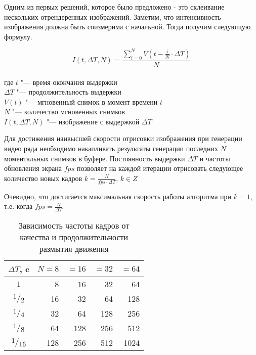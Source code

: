 Одним из первых решений, которое было предложено - это склеивание нескольких отрендеренных изображений. \cite{Haeberli90} Заметим, что интенсивность изображения должна быть соизмерима с начальной. Тогда получим следующую формулу.
\begin{eqndesc}
    \begin{equation}\label{F:F202}
        I(t, \Delta T, N) = \frac{ \sum_{i=0}^{N} { V({t - \frac{i}{N} \cdot \Delta T})}}{N}
    \end{equation}
    \\
    где $t$ "--- время окончания выдержки \\
    $\Delta T$ "--- продолжительность выдержки \\
    $V(t)$ "--- мгновенный снимок в момент времени $t$\\
    $N$ "--- количество мгновенных снимков \\
    $I(t, \Delta T, N)$ "--- изображение с выдержкой $\Delta T$
\end{eqndesc}

Для достижения наивысшей скорости отрисовки изображения при генерации видео ряда необходимо накапливать результаты генерации последних $N$ моментальных снимков в буфере. Постоянность выдержки $\Delta T$ и частоты обновления экрана $fps$  позволяет на каждой итерации отрисовать следующее количество новых кадров  $k = \frac{N}{fps \cdot \Delta T}$, $k \in Z$
\par
Очевидно, что достигается максимальная скорость работы алгоритма при $k = 1$, т.е. когда $fps = \frac{N}{\Delta T}$


\begin{table}[ht]
    \caption{Зависимость частоты кадров от качества и продолжительности размытия движения}
    \begin{tabular}{|c|r|r|r|r|}
        \hline
        $\Delta T$, c  & $N =8$ & $=16$ & $=32$ & $=64$ \\
        \hline
        $1$            & 8      & 16    & 32    & 64    \\
        $\frc{1}{2}$  & 16     & 32    & 64    & 128   \\
        $\frc{1}{4}$  & 32     & 64    & 128   & 256   \\
        $\frc{1}{8}$  & 64     & 128   & 256   & 512   \\
        $\frc{1}{16}$ & 128    & 256   & 512   & 1024  \\
        \hline
    \end{tabular}
    \label{tab:tabular}
\end{table}


